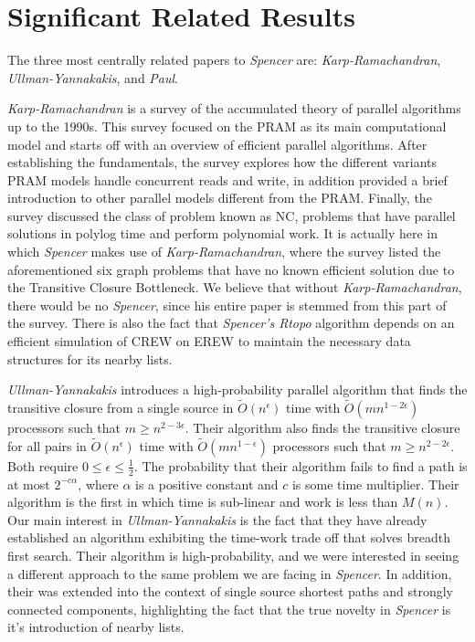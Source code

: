\documentclass[paper=a4, fontsize=11pt]{scrartcl} %
\numberwithin{equation}{section} %
\numberwithin{figure}{section} %
\numberwithin{table}{section} %
\begin{document}

\section{Significant Related Results}

The three most centrally related papers to \textit{Spencer\cite{S97}} are:  \textit{Karp-Ramachandran\cite{KR90}}, \textit{Ullman-Yannakakis\cite{UY91}}, and \textit{Paul\cite{P83}}.

\textit{Karp-Ramachandran\cite{KR90}} is a survey of the accumulated theory of parallel algorithms up to the 1990s. This survey focused on the PRAM as its main computational model and starts off with an overview of efficient parallel algorithms. After establishing the fundamentals, the survey explores how the different variants PRAM models handle concurrent reads and write, in addition provided a brief introduction to other parallel models different from the PRAM. Finally, the survey discussed the class of problem known as NC, problems that have parallel solutions in polylog time and perform polynomial work.  It is actually here in which \textit{Spencer\cite{S97}} makes use of \textit{Karp-Ramachandran\cite{KR90}}, where the survey listed the aforementioned six graph problems that have no known efficient solution due to the Transitive Closure Bottleneck. We believe that without \textit{Karp-Ramachandran\cite{KR90}}, there would be no \textit{Spencer\cite{S97}}, since his entire paper is stemmed from this part of the survey. There is also the fact that \textit{Spencer\cite{S97}'s Rtopo} algorithm depends on an efficient simulation of CREW on EREW to maintain the necessary data structures for its nearby lists.

\textit{Ullman-Yannakakis\cite{UY91}} introduces a high-probability parallel algorithm that finds the transitive closure from a single source in $\tilde{O}(n^\epsilon)$ time with $\tilde{O}(mn^{1-2\epsilon})$ processors such that $m \geq n^{2-3\epsilon}$. Their algorithm also finds the transitive closure for all pairs in $\tilde{O}(n^\epsilon)$ time with $\tilde{O}(mn^{1-\epsilon})$ processors such that $m \geq n^{2-2\epsilon}$. Both require $0 \leq \epsilon \leq \frac{1}{2}$. The probability that their algorithm fails to find a path is at most $2^{-c\alpha}$, where $\alpha$ is a positive constant and $c$ is some time multiplier. Their algorithm is the first in which time is sub-linear and work is less than $M(n)$. Our main interest in \textit{Ullman-Yannakakis\cite{UY91}} is the fact that they have already established an algorithm exhibiting the time-work trade off that solves breadth first search. Their algorithm is high-probability, and we were interested in seeing a different approach to the same problem we are facing in \textit{Spencer\cite{S97}}. In addition, their was extended into the context of single source shortest paths and strongly connected components, highlighting the fact that the true novelty in \textit{Spencer\cite{S97}} is it's introduction of nearby lists.
\end{document}
